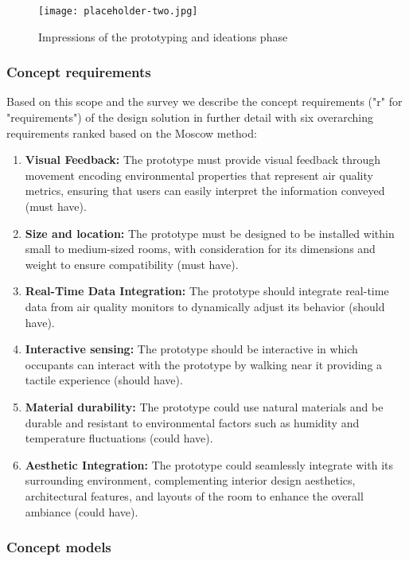 \begin{figure}[b]
    \centering
    \texttt{[image: placeholder-two.jpg]}
    \caption{Impressions of the prototyping and ideations phase}
    \label{fig:complexity}
\end{figure}

\subsubsection{Concept requirements}

Based on this scope and the survey we describe the concept requirements ("r" for "requirements") of the design solution in further detail with six overarching requirements ranked based on the Moscow method:

\begin{enumerate}
    \renewcommand{\labelenumi}{R\arabic{enumi}:}
    \item \textbf{Visual Feedback:} The prototype must provide visual feedback through movement encoding environmental properties that represent air quality metrics, ensuring that users can easily interpret the information conveyed (must have).
    \item \textbf{Size and location:} The prototype must be designed to be installed within small to medium-sized rooms, with consideration for its dimensions and weight to ensure compatibility (must have).
    \item \textbf{Real-Time Data Integration:} The prototype should integrate real-time data from air quality monitors to dynamically adjust its behavior (should have).
    \item \textbf{Interactive sensing:} The prototype should be interactive in which occupants can interact with the prototype by walking near it providing a tactile experience (should have).
    \item \textbf{Material durability:} The prototype could use natural materials and be durable and resistant to environmental factors such as humidity and temperature fluctuations (could have).
    \item \textbf{Aesthetic Integration:} The prototype could seamlessly integrate with its surrounding environment, complementing interior design aesthetics, architectural features, and layouts of the room to enhance the overall ambiance (could have).
\end{enumerate}

\subsubsection{Concept models}

